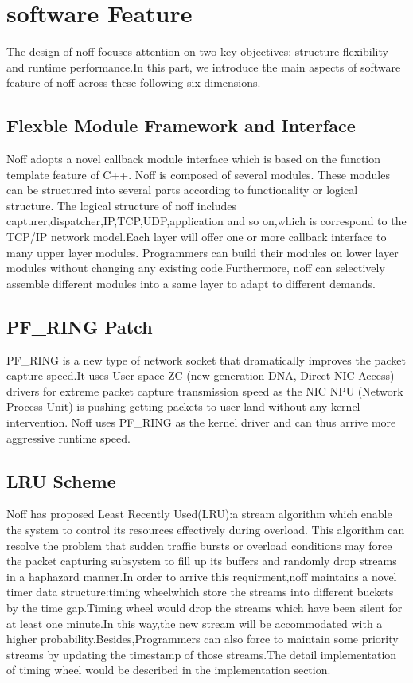 \documentclass[conference]{IEEEtran}
\begin{document}
\section{software Feature}
The design of noff focuses attention on two key objectives: structure flexibility and runtime performance.In this part, we introduce the main aspects of software feature of noff across these following six dimensions.

\subsection{Flexble Module Framework and Interface}

Noff adopts a novel callback module interface which is based on the function template feature of C++. Noff is composed of several modules.
These modules can be structured into several parts according to functionality or logical structure. The logical structure of noff includes capturer,dispatcher,IP,TCP,UDP,application and so on,which is correspond to the TCP/IP network model.Each layer will offer one or more callback interface to many upper layer modules. Programmers can build their modules on lower layer modules without changing any existing code.Furthermore, noff can selectively assemble different modules into a same layer to adapt to different demands.

\subsection{PF\_RING Patch}
PF\_RING is a new type of network socket that dramatically improves the packet capture speed.It uses User-space ZC (new generation DNA, Direct NIC Access) drivers for extreme packet capture transmission speed as the NIC NPU (Network Process Unit) is pushing getting packets to user land without any kernel intervention. 
Noff uses PF\_RING as the kernel driver and can thus arrive more aggressive runtime speed.

\subsection{LRU Scheme}
Noff has proposed Least Recently Used(LRU):a stream algorithm which enable the system to control its resources effectively during overload. This algorithm can resolve the problem that sudden traffic bursts or overload conditions may force the packet capturing subsystem to fill up its buffers and randomly drop streams in a haphazard manner.In order to arrive this requirment,noff maintains a novel timer data structure:timing wheel\cite{Varghese}which store the streams into different buckets by the time gap.Timing wheel would drop the streams which have been silent for at least one minute.In this way,the new stream will be accommodated with a higher probability.Besides,Programmers can also force to maintain some priority streams by updating the timestamp of those streams.The detail implementation of timing wheel would be described in the implementation section.
\end{document}
